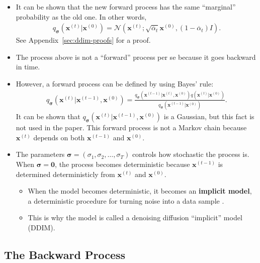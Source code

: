 \documentclass[10pt]{article}
\newcommand{\ve}[1]{\mathbf{#1}}
\newcommand{\ves}[1]{\boldsymbol{#1}}
\newcommand{\mcal}[1]{\mathcal{#1}}
\begin{document}
\begin{itemize}
  \item It can be shown that the new forward process has the same ``marginal'' probability as the old one. In other words,
  \begin{align*}
    q_{\ves{\sigma}}(\ve{x}^{(t)}|\ve{x}^{(0)}) = \mcal{N}(\ve{x}^{(t)}; \sqrt{\overline{\alpha}_t} \ve{x}^{(0)}, (1-\overline{\alpha}_t) I).
  \end{align*}
  See Appendix~\ref{sec:ddim-proofs} for a proof.

  \item The process above is not a ``forward'' process per se because it goes backward in time.
  
  \item However, a forward process can be defined by using Bayes' rule:
  \begin{align*}
    q_{\ves{\sigma}}(\ve{x}^{(t)}|\ve{x}^{(t-1)}, \ve{x}^{(0)}) = \frac{q_{\ves{\sigma}}(\ve{x}^{(t-1)}|\ve{x}^{(t)},\ve{x}^{(0)})q(\ve{x}^{(t)}|\ve{x}^{(0)})}{q_{\ves{\sigma}}(\ve{x}^{(t-1)}|\ve{x}^{(0)})}.
  \end{align*}
  It can be shown that $q_{\ves{\sigma}}(\ve{x}^{(t)}|\ve{x}^{(t-1)}, \ve{x}^{(0)})$ is a Gaussian, but this fact is not used in the paper. This forward process is not a Markov chain because $\ve{x}^{(t)}$ depends on both $\ve{x}^{(t-1)}$ and $\ve{x}^{(0)}$.

  \item The parameters $\ves{\sigma} = (\sigma_1, \sigma_2, \dotsc, \sigma_T)$ controls how stochastic the process is. When $\ves{\sigma} = \ve{0}$, the process becomes deterministic because $\ve{x}^{(t-1)}$ is determined deterministicly from $\ve{x}^{(t)}$ and $\ve{x}^{(0)}$.
  
  \begin{itemize}
    \item When the model becomes deterministic, it becomes an {\bf implicit model}, a deterministic procedure for turning noise into a data sample \cite{Mohamed:2016}.
    
    \item This is why the model is called a denoising diffusion ``implicit'' model (DDIM).
  \end{itemize}
\end{itemize}

\subsection{The Backward Process}
\end{document}
